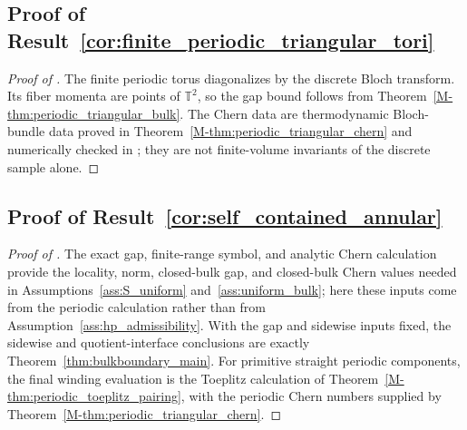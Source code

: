 \documentclass[11pt]{article}
\numberwithin{equation}{section}
\theoremstyle{definition}
\theoremstyle{remark}
\begin{document}
\subsection{Proof of Result~\ref{cor:finite_periodic_triangular_tori}}\label{app:proof:cor:finite_periodic_triangular_tori}
\begin{proof}[Proof of ]
The finite periodic torus diagonalizes by the discrete Bloch transform. Its fiber momenta are
points of \(\mathbb T^2\), so the gap bound follows from Theorem~\ref{M-thm:periodic_triangular_bulk}.
The Chern data are thermodynamic Bloch-bundle data proved in
Theorem~\ref{M-thm:periodic_triangular_chern} and numerically checked in
; they are not finite-volume invariants of the discrete
sample alone.
\end{proof}

\subsection{Proof of Result~\ref{cor:self_contained_annular}}\label{app:proof:cor:self_contained_annular}
\begin{proof}[Proof of ]
The exact gap, finite-range symbol, and analytic Chern calculation provide the locality, norm,
closed-bulk gap, and closed-bulk Chern values needed in
Assumptions~\ref{ass:S_uniform} and~\ref{ass:uniform_bulk}; here these inputs come from the
periodic calculation rather than from Assumption~\ref{ass:hp_admissibility}. With the gap and
sidewise inputs fixed, the sidewise and quotient-interface conclusions are exactly
Theorem~\ref{thm:bulkboundary_main}. For primitive straight periodic components, the final winding
evaluation is the Toeplitz calculation of Theorem~\ref{M-thm:periodic_toeplitz_pairing}, with the
periodic Chern numbers supplied by Theorem~\ref{M-thm:periodic_triangular_chern}.
\end{proof}
\end{document}
